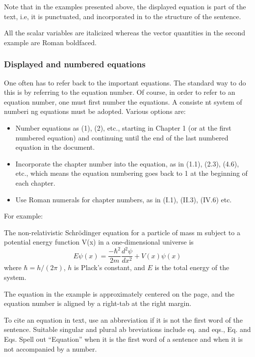 Note that in the examples presented above, the displayed equation is part of the text, i.e, it is punctuated, and incorporated in to the structure of the sentence.

All the scalar variables are italicized whereas the vector quantities in the second example are Roman boldfaced.

\subsubsection*{Displayed and numbered equations}
\label{sec:dineq}

One often has to refer back to the important equations. The standard way to do this is by referring to the equation number. Of course, in order to refer to an equation number, one must first number the equations. A consiste nt system of numberi ng equations must be adopted. Various options are:
\begin{itemize}
\item Number equations as (1), (2), etc., starting in Chapter 1 (or at the first numbered equation) and continuing until the end of the last numbered equation in the document.
\item Incorporate the chapter number into the equation, as in (1.1),  (2.3), (4.6), etc., which means the equation numbering goes back to 1 at the beginning of each chapter.
\item Use Roman numerals for chapter numbers, as in (I.1), (II.3), (IV.6) etc.
\end{itemize}

For example:

\begin{IMleftrightskip}
The non-relativistic Schrödinger equation for a particle of mass m
subject to a potential energy function V(x) in a one-dimensional universe is
%
\begin{equation}
  \label{eq:1}
  E \psi(x) = \frac{-\hbar^2}{2m} \frac{d^2\psi}{d x^2} + V(x)\psi(x)
\end{equation}
%
where $\hbar = h/(2\pi)$, $h$ is Plack’s constant, and $E$ is the total energy of the system.
\end{IMleftrightskip}

The equation in the example is approximately centered on the page, and the equation number is aligned by a right-tab at the right margin.

To cite an equation in text, use an abbreviation if it is not the first word of the sentence. Suitable singular and plural ab breviations include eq. and eqs., Eq. and Eqs. Spell out “Equation” when it is the first word of a sentence and when it is not accompanied by a number.

